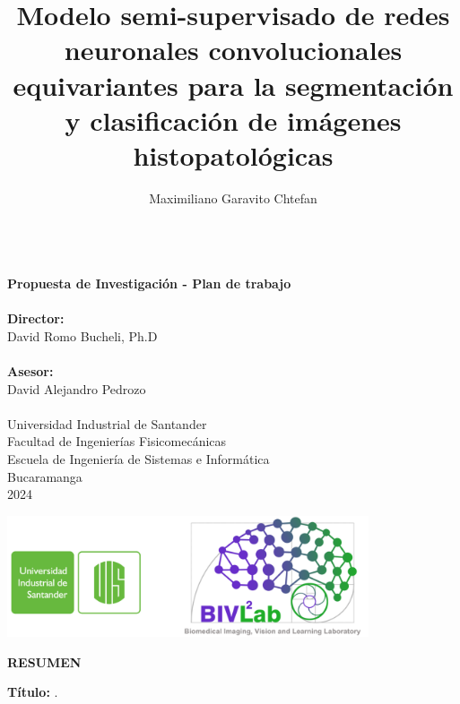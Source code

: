 \documentclass[12pt,letterpaper,final, openany]{scrbook}
\author{Maximiliano Garavito Chtefan}\let\Author\@author
\title{Modelo semi-supervisado de redes neuronales convolucionales equivariantes para la segmentación y clasificación de imágenes histopatológicas}\let\Title\@title
\begin{document}
\begin{center}
\vspace*{0.2cm}
\Large\textbf{\Title }\\[2cm]
\large\textbf{Propuesta de Investigación - Plan de trabajo}\\[2cm]
\Large\Author\\[2cm]
\large\textbf{Director:}\\
\large{David Romo Bucheli, Ph.D}\\[0.5cm]
\\[2cm]
\large\textbf{Asesor:}\\
\large{David Alejandro Pedrozo}\\[0.5cm]
\\[2cm]
\normalsize Universidad Industrial de Santander\\
Facultad de Ingenierías Fisicomecánicas\\
Escuela de Ingeniería de Sistemas e Informática\\
Bucaramanga\\
2024\\[1.5cm]
\begin{center}
\includegraphics[width=0.8\textwidth]{logos.png}
\end{center}
\end{center}


\setcounter{tocdepth}{2}
\tableofcontents
\newpage
{}
\setcounter{page}{1}
\begin{center}
\Large\textbf{RESUMEN}\\[20pt]
\end{center}
\textbf{Título:} \Title.\footnotemark[1]
\end{document}
